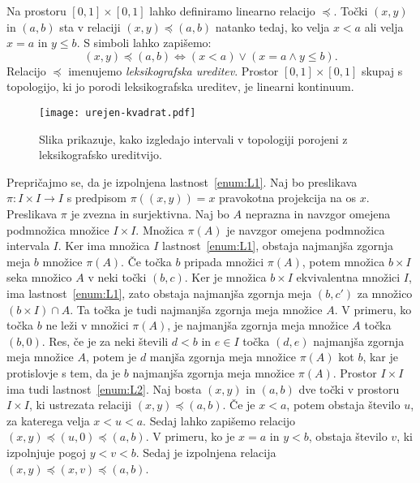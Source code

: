 \documentclass[../TG_magistrsko_delo_sections.tex]{subfiles}
\begin{document}
\begin{primer}
Na prostoru $[0, 1] \times [0, 1]$ lahko definiramo linearno relacijo $\preccurlyeq$. Točki $(x, y)$ in $(a, b)$ sta v relaciji $(x, y) \preccurlyeq (a, b)$ natanko tedaj, ko velja $x < a$ ali velja $x = a$ in $y \leq b$. S simboli lahko zapišemo:
$$(x, y) \preccurlyeq (a, b) \Leftrightarrow (x < a) \lor (x = a \land y \leq b).$$
Relacijo $\preccurlyeq$ imenujemo \emph{leksikografska ureditev}. Prostor $[0, 1] \times [0, 1]$ skupaj s topologijo, ki jo porodi leksikografska ureditev, je linearni kontinuum. 

\begin{figure}[h]
  \centering
  \texttt{[image: urejen-kvadrat.pdf]}
  \caption[Primer vektorske slike.]{Slika prikazuje, kako izgledajo intervali v topologiji porojeni z leksikografsko ureditvijo.}
  \label{fig:varsavski_lok}
\end{figure}

Prepričajmo se, da je izpolnjena lastnost~\ref{enum:L1}. Naj bo preslikava $\pi : I \times I \to I$ s predpisom $\pi((x, y)) = x$ pravokotna projekcija na os $x$. Preslikava $\pi$ je zvezna in surjektivna. Naj bo $A$ neprazna in navzgor omejena podmnožica množice $I \times I$. Množica $\pi(A)$ je navzgor omejena podmnožica intervala $I$. Ker ima množica $I$ lastnost~\ref{enum:L1}, obstaja najmanjša zgornja meja $b$ množice $\pi(A)$. Če točka $b$ pripada množici $\pi(A)$, potem množica $b \times I$ seka množico $A$ v neki točki $(b, c)$. Ker je množica $b \times I$ ekvivalentna množici $I$, ima lastnost~\ref{enum:L1}, zato obstaja najmanjša zgornja meja $(b, c')$ za množico $(b \times I) \cap A$. Ta točka je tudi najmanjša zgornja meja množice $A$.
V primeru, ko točka $b$ ne leži v množici $\pi(A)$, je najmanjša zgornja meja množice $A$ točka $(b, 0)$. Res, če je za neki števili $d < b$ in $e \in I$ točka $(d, e)$ najmanjša zgornja meja množice $A$, potem je $d$ manjša zgornja meja množice $\pi(A)$ kot $b$, kar je protislovje s tem, da je $b$ najmanjša zgornja meja množice $\pi(A)$.
Prostor $I \times I$ ima tudi lastnost~\ref{enum:L2}. Naj bosta $(x, y)$ in $(a, b)$ dve točki v prostoru $I \times I$, ki ustrezata relaciji $(x, y) \preccurlyeq (a, b)$. Če je $x < a$, potem obstaja število $u$, za katerega velja $x<u<a$. Sedaj lahko zapišemo relacijo $(x, y) \preccurlyeq (u, 0) \preccurlyeq (a, b)$. V primeru, ko je $x=a$ in $y<b$, obstaja število $v$, ki izpolnjuje pogoj $y<v<b$. Sedaj je izpolnjena relacija $(x, y) \preccurlyeq (x, v) \preccurlyeq (a, b)$. 
\end{primer}
\end{document}

